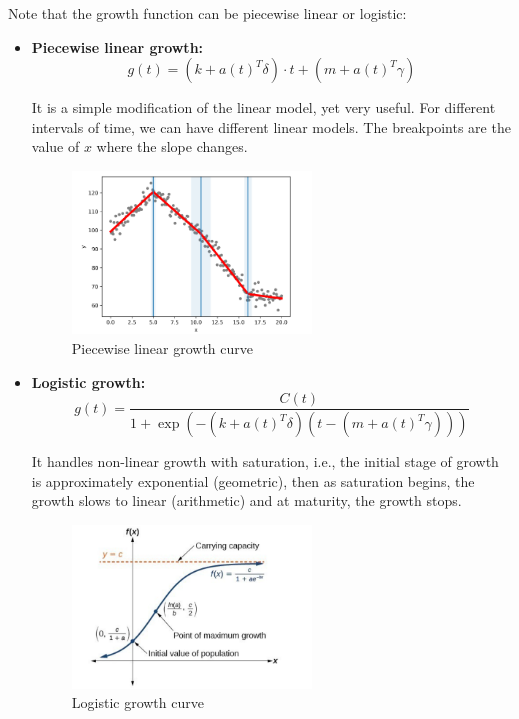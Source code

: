 Note that the growth function can be piecewise linear or logistic:
\begin{itemize}
    \item \textbf{Piecewise linear growth:} 
    $$g(t) = (k + a(t)^T \delta) \cdot t + (m + a(t)^T \gamma)$$

    It is a simple modification of the linear model, yet very useful. For 
    different intervals of time, we can have different linear models. The breakpoints 
    are the value of $x$ where the slope changes.

    \begin{figure}[H]
        \centering
        \includegraphics[width=0.6\textwidth]{figures/lin_growth.png}
        \caption{Piecewise linear growth curve}
        \label{fig:piecewise_linear}
    \end{figure}

    \item \textbf{Logistic growth:} 
    $$g(t) = \frac{C(t)}{1 + \exp(-(k + a(t)^T \delta)(t-(m + a(t)^T\gamma)))}$$

    It handles non-linear growth with saturation, i.e., the initial stage of growth is
    approximately exponential (geometric), then as saturation begins, the growth slows to 
    linear (arithmetic) and at maturity, the growth stops.

    \begin{figure}[H]
        \centering
        \includegraphics[width=0.6\textwidth]{figures/log_growth.png}
        \caption{Logistic growth curve}
        \label{fig:logistic_growth}
    \end{figure}

\end{itemize}

